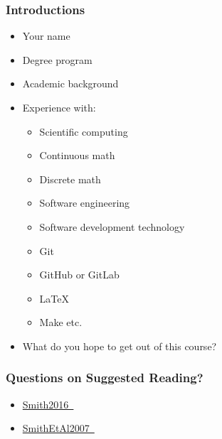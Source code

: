 \documentclass[t,12pt,numbers,fleqn]{beamer}
\begin{document}

\begin{frame}
\frametitle{Introductions}

\begin{itemize}
\item Your name
\item Degree program
\item Academic background
\item Experience with:
\begin{itemize}
\item Scientific computing
\item Continuous math
\item Discrete math
\item Software engineering
\item Software development technology
\bi
\item Git
\item GitHub or GitLab
\item LaTeX
\item Make etc.
\ei
\end{itemize}
\item What do you hope to get out of this course?
\end{itemize}

\end{frame}


\begin{frame}
\frametitle{Questions on Suggested Reading?}

\begin {itemize}

\item \href{https://gitlab.cas.mcmaster.ca/smiths/cas741/blob/master/ReferenceMaterial/SoftEngForScienceBook.pdf}{Smith2016~\cite{Smith2016}}
\item \href{https://gitlab.cas.mcmaster.ca/smiths/cas741/blob/master/ReferenceMaterial/SmithLaiAndKhedri2007fulltext.pdf}{SmithEtAl2007~\cite{SmithEtAl2007}}

\end{itemize}

\end{frame}

\end{document}
